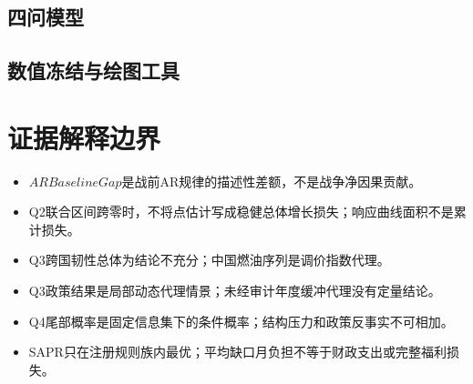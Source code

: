\begin{appendices}
\subsection{四问模型}






\subsection{数值冻结与绘图工具}






\section{证据解释边界}

\begin{itemize}
  \item $ARBaselineGap$是战前AR规律的描述性差额，不是战争净因果贡献。
  \item Q2联合区间跨零时，不将点估计写成稳健总体增长损失；响应曲线面积不是累计损失。
  \item Q3跨国韧性总体为结论不充分；中国燃油序列是调价指数代理。
  \item Q3政策结果是局部动态代理情景；未经审计年度缓冲代理没有定量结论。
  \item Q4尾部概率是固定信息集下的条件概率；结构压力和政策反事实不可相加。
  \item SAPR只在注册规则族内最优；平均缺口月负担不等于财政支出或完整福利损失。
\end{itemize}

\end{appendices}
